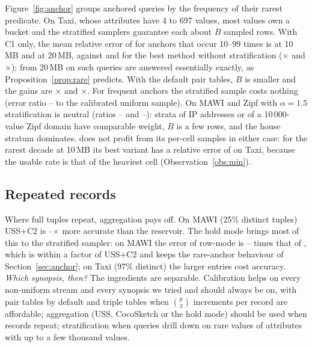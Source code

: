 Figure~\ref{fig:anchor} groups anchored queries by the frequency of their rarest predicate. On Taxi,
whose attributes have 4 to 697 values, most values own a bucket and the stratified samplers guarantee each
about $B$ sampled rows. With C1 only, the mean relative error of \cs for anchors that occur 10--99 times is
\NumTaxiDOneCsOneTen{} at 10\,MB and \NumTaxiDOneCsOneTwenty{} at 20\,MB, against \NumTaxiDOneOtherTen{}
and \NumTaxiDOneOtherTwenty{} for the best method without stratification
(\NumTaxiDOneGainOneTen$\times$ and \NumTaxiDOneGainOneTwenty$\times$); from 20\,MB on such queries are
answered essentially exactly, as Proposition~\ref{prop:rare} predicts. With the default pair tables, $B$ is
smaller and the gains are \NumTaxiDOneGainTen$\times$ and \NumTaxiDOneGainTwenty$\times$. For frequent
anchors the stratified sample costs nothing (error ratio \NumTaxiFreqPenaltyLo--\NumTaxiFreqPenaltyHi{} to
the calibrated uniform sample). On MAWI and Zipf with $\alpha=1.5$ stratification is neutral (ratios
\NumAnchorNeutralMawiLo--\NumAnchorNeutralMawiHi{} and
\NumAnchorNeutralZipfFifteenLo--\NumAnchorNeutralZipfFifteenHi): strata of IP addresses or of a
10\,000-value Zipf domain have comparable weight, $B$ is a few rows, and the house stratum dominates.
\omni does not profit from its per-cell samples in either case: for the rarest decade at 10\,MB its best
variant has a relative error of \NumOmniAnchorDOneTaxi{} on Taxi, because the usable rate is that of the
heaviest cell (Observation~\ref{obs:min}).

\subsection{Repeated records}\label{sec:repeat}

Where full tuples repeat, aggregation pays off. On MAWI (25\% distinct tuples) \textsc{USS+C2} is
\NumUssCalTwoVsResMawiLo--\NumUssCalTwoVsResMawiHi$\times$ more accurate than the reservoir. The hold mode
brings most of this to the stratified sampler: on MAWI the error of row-mode \cs is
\NumCshVsCsMawiLo--\NumCshVsCsMawiHi{} times that of \csh, which is within a factor
\NumCshVsUssCalTwoMawiHi{} of \textsc{USS+C2} and keeps the rare-anchor behaviour of
Section~\ref{sec:anchor}; on Taxi (97\% distinct) the larger entries cost accuracy.
\emph{Which synopsis, then?} The ingredients are separable. Calibration helps on every non-uniform stream
and every synopsis we tried and should always be on, with pair tables by default and triple tables when
$\binom p3$ increments per record are affordable; aggregation (USS, CocoSketch or the hold mode) should
be used when records repeat; stratification when queries drill down on rare values of attributes with up
to a few thousand values.

